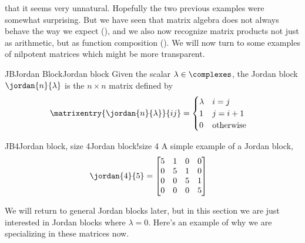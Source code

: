 that it seems very unnatural.  Hopefully the two previous examples were somewhat surprising.  But we have seen that matrix algebra does not always behave the way we expect (), and we also now recognize matrix products not just as arithmetic, but as function composition ().  We will now turn to some examples of nilpotent matrices which might be more transparent.
%
\begin{definition}{JB}{Jordan Block}{Jordan block}
Given the scalar $\lambda\in\complexes$, the Jordan block $\jordan{n}{\lambda}$ is the $n\times n$ matrix defined by
%
\begin{align*}
\matrixentry{\jordan{n}{\lambda}}{ij}
&=
\begin{cases}
\lambda & i=j\\
1 & j=i+1\\
0 & \text{otherwise}
\end{cases}
\end{align*}
%
%
\end{definition}
%
\begin{example}{JB4}{Jordan block, size 4}{Jordan block!size 4}
A simple example of a Jordan block,
%
\begin{align*}
\jordan{4}{5}&=
\begin{bmatrix}
5 & 1 & 0 & 0\\
0 & 5 & 1 & 0\\
0 & 0 & 5 & 1\\
0 & 0 & 0 & 5
\end{bmatrix}
\end{align*}
%
\end{example}
%
We will return to general Jordan blocks later, but in this section we are just interested in Jordan blocks where $\lambda=0$.  Here's an example of why we are specializing in these matrices now.
%
